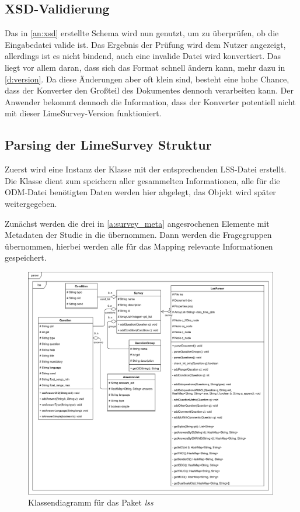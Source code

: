 \subsection{XSD-Validierung}


Das in \cref{an:xsd} erstellte Schema wird nun genutzt, um zu überprüfen, ob die Eingabedatei valide ist.
Das Ergebnis der Prüfung wird dem Nutzer angezeigt, allerdings ist es nicht bindend, auch eine invalide Datei wird konvertiert.
Das liegt vor allem daran, dass sich das Format schnell ändern kann, mehr dazu in \cref{d:version}.
Da diese Änderungen aber oft klein sind, besteht eine hohe Chance, dass der Konverter den Großteil des Dokumentes dennoch verarbeiten kann.
Der Anwender bekommt dennoch die Information, dass der Konverter potentiell nicht mit dieser LimeSurvey-Version funktioniert.

\subsection{Parsing der LimeSurvey Struktur}

Zuerst wird eine Instanz der Klasse  mit der entsprechenden LSS-Datei erstellt.
Die Klasse  dient zum speichern aller gesammelten Informationen, alle für die ODM-Datei benötigten Daten werden hier abgelegt, das Objekt wird später weitergegeben.

Zunächst werden die drei in \cref{a:survey_meta} angesrochenen Elemente mit Metadaten der Studie in die  übernommen.
Dann werden die Fragegruppen übernommen, hierbei werden alle für das Mapping relevante Informationen gespeichert.

\begin{figure}[h]
	\label{im:fig:lss}
			\centering
			\includegraphics[width=0.99\textwidth]{./img/cls_lss.png}
			\caption{Klassendiagramm für das Paket \textit{lss}}
\end{figure}

